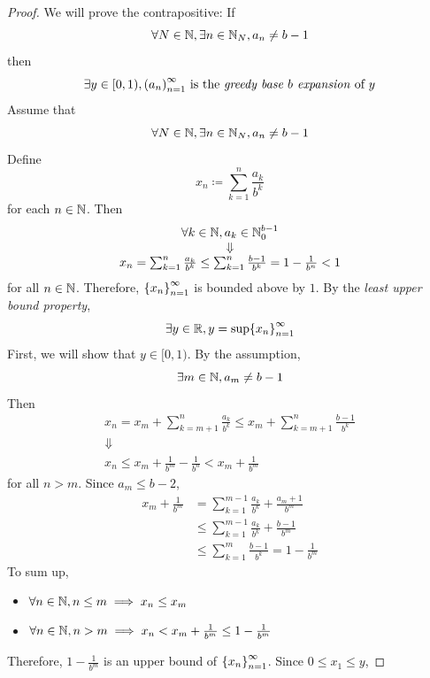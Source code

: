 \begin{proof}
    We will prove the contrapositive: If
    \[
    \forall N \in \N, \exists n \in \N_{N}, a_{n} \neq b - 1
    \]
    then
    \[
    \exists y \in [0, 1), \paren*{a_{n}}_{n = 1}^{\infty} \text{ is the \emph{greedy base $b$ expansion} of $y$}
    \]
    Assume that
    \[
    \forall N \in \N, \exists n \in \N_{N}, a_{n} \neq b - 1
    \]
    Define
    \[
    x_{n} \coloneqq \sum_{k = 1}^{n} \frac{a_{k}}{b^{k}}
    \]
    for each $n \in \N$. Then
    \[
    \begin{array}{c}
        \forall k \in \N, a_{k} \in \N_{0}^{b - 1} \\
        \Downarrow \\
        x_{n} = \sum_{k = 1}^{n} \frac{a_{k}}{b^{k}} \leq \sum_{k = 1}^{n} \frac{b - 1}{b^{k}} = 1 - \frac{1}{b^{n}} < 1
    \end{array}
    \]
    for all $n \in \N$. Therefore, $\set*{x_{n}}_{n = 1}^{\infty}$ is bounded above by $1$.
    By the \emph{least upper bound property},
    \[
    \exists y \in \R, y = \sup \set*{x_{n}}_{n = 1}^{\infty}
    \]
    First, we will show that $y \in [0, 1)$. By the assumption,
    \[
    \exists m \in \N, a_{m} \neq b - 1
    \]
    Then
    \[
    \begin{array}{c}
        x_{n} = x_{m} + \sum_{k = m + 1}^{n} \frac{a_{k}}{b^{k}} \leq x_{m} + \sum_{k = m + 1}^{n} \frac{b - 1}{b^{k}} \\
        \Downarrow \\
        x_{n} \leq x_{m} + \frac{1}{b^{m}} - \frac{1}{b^{n}} < x_{m} + \frac{1}{b^{m}}
    \end{array}
    \]
    for all $n > m$. Since $a_{m} \leq b - 2$,
    \begin{align*}
        x_{m} + \frac{1}{b^{m}} &= \sum_{k = 1}^{m - 1} \frac{a_{k}}{b^{k}} + \frac{a_{m} + 1}{b^{m}} \\
        &\leq \sum_{k = 1}^{m - 1} \frac{a_{k}}{b^{k}} + \frac{b - 1}{b^{m}} \\
        &\leq \sum_{k = 1}^{m} \frac{b - 1}{b^{k}} = 1 - \frac{1}{b^{m}}
    \end{align*}
    To sum up,
    \begin{itemize}
        \item $\forall n \in \N, n \leq m \implies x_{n} \leq x_{m}$
        \item $\forall n \in \N, n > m \implies x_{n} < x_{m} + \frac{1}{b^{m}} \leq 1 - \frac{1}{b^{m}}$
    \end{itemize}
    Therefore, $1 - \frac{1}{b^{m}}$ is an upper bound of $\set*{x_{n}}_{n = 1}^{\infty}$. Since $0 \leq x_{1} \leq y$,

\end{proof}
